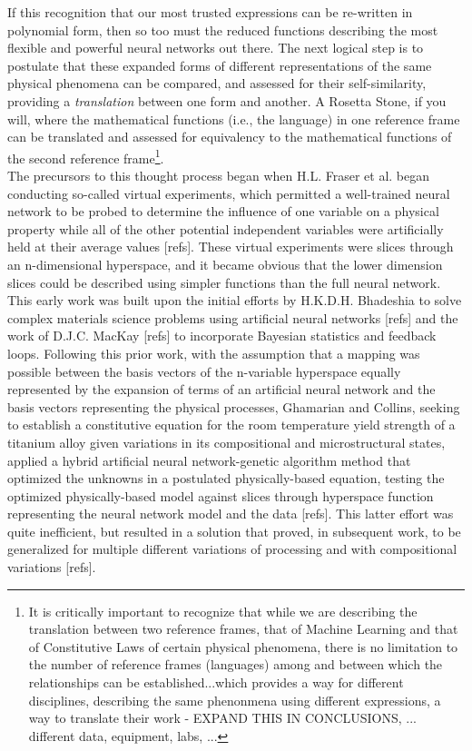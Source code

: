 If this recognition that our most trusted expressions can be re-written in polynomial form, then so too must the reduced functions describing the most flexible and powerful neural networks out there.  The next logical step is to postulate that these expanded forms of different representations of the same physical phenomena can be compared, and assessed for their self-similarity, providing a \textit{translation} between one form and another.  A Rosetta Stone, if you will, where the mathematical functions (i.e., the language) in one reference frame can be translated and assessed for equivalency to the mathematical functions of the second reference frame\footnote{It is critically important to recognize that while we are describing the translation between two reference frames, that of Machine Learning and that of Constitutive Laws of certain physical phenomena, there is no limitation to the number of reference frames (languages) among and between which the relationships can be established...which provides a way for different disciplines, describing the same phenonmena using different expressions, a way to translate their work - EXPAND THIS IN CONCLUSIONS, ... different data, equipment, labs, ...}.\\

The precursors to this thought process began when H.L. Fraser et al. began conducting so-called virtual experiments, which permitted a well-trained neural network to be probed to determine the influence of one variable on a physical property while all of the other potential independent variables were artificially held at their average values [refs]. These virtual experiments were slices through an n-dimensional hyperspace, and it became obvious that the lower dimension slices could be described using simpler functions than the full neural network.  This early work was built upon the initial efforts by H.K.D.H. Bhadeshia to solve complex materials science problems using artificial neural networks [refs] and the work of D.J.C. MacKay [refs] to incorporate Bayesian statistics and feedback loops.  Following this prior work, with the assumption that a mapping was possible between the basis vectors of the n-variable hyperspace equally represented by the expansion of terms of an artificial neural network and the basis vectors representing the physical processes, Ghamarian and Collins, seeking to establish a constitutive equation for the room temperature yield strength of a titanium alloy given variations in its compositional and microstructural states, applied a hybrid artificial neural network-genetic algorithm method that optimized the unknowns in a postulated physically-based equation, testing the optimized physically-based model against slices through hyperspace function representing the neural network model and the data [refs]. This latter effort was quite inefficient, but resulted in a solution that proved, in subsequent work, to be generalized for multiple different variations of processing and with compositional variations [refs].   \\

